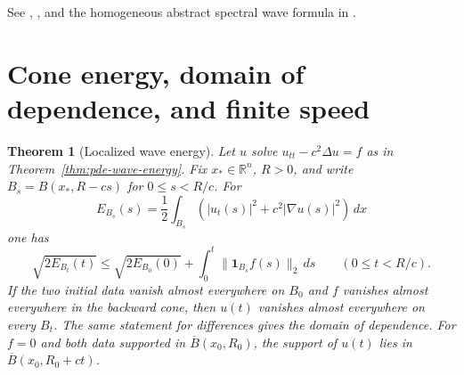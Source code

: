 \documentclass[11pt,oneside,openany]{book}
\theoremstyle{plain}
\newtheorem{theorem}{Theorem}[chapter]
\theoremstyle{definition}
\theoremstyle{remark}
\begin{document}
See \cite[Sections 2.4 and 4.3.1]{Evans},
\cite[Chapter 6, Section 2]{TaylorI}, and the homogeneous abstract
spectral wave formula in \cite{D16}.

\section{Cone energy, domain of dependence, and finite speed}\label{pde:W04}

\begin{theorem}[Localized wave energy]\label{thm:pde-wave-cone}
Let \(u\) solve \(u_{tt}-c^2\Delta u=f\) as in
Theorem~\ref{thm:pde-wave-energy}. Fix \(x_*\in\mathbb R^n\),
\(R>0\), and write \(B_s=B(x_*,R-cs)\) for \(0\leq s<R/c\).
For
\[
 E_{B_s}(s)=\frac12\int_{B_s}(|u_t(s)|^2+c^2|\nabla u(s)|^2)\,dx
\]
one has
\[
 \sqrt{2E_{B_t}(t)}\leq \sqrt{2E_{B_0}(0)}
       +\int_0^t\|\mathbf 1_{B_s}f(s)\|_2\,ds
                 \qquad (0\leq t<R/c).
\]
If the two initial data vanish almost everywhere on \(B_0\)
and \(f\) vanishes almost everywhere in the backward cone, then
\(u(t)\) vanishes almost everywhere on every \(B_t\).
The same statement for differences gives the domain of dependence.
For \(f=0\) and both data supported in \(\overline B(x_0,R_0)\),
the support of \(u(t)\) lies in \(\overline B(x_0,R_0+ct)\).
\end{theorem}
\end{document}
